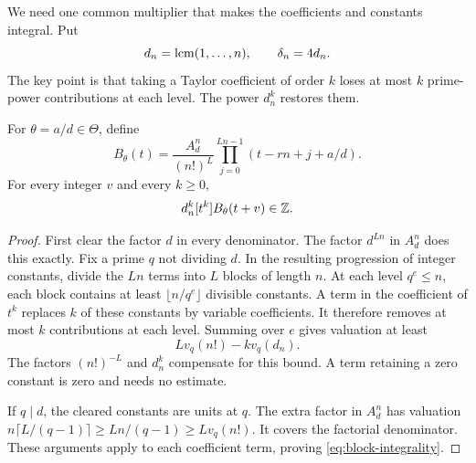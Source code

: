 We need one common multiplier that makes the coefficients and constants
integral. Put
\[
 d_n=\operatorname{lcm}(1,\ldots,n),\qquad \delta_n=4d_n.
\]
The key point is that taking a Taylor coefficient of order $k$ loses
at most $k$ prime-power contributions at each level. The power
$d_n^k$ restores them.

\begin{lemma}\label{lem:progression}
For $\theta=a/d\in\Theta$, define
\[
 B_\theta(t)=\frac{A_d^n}{(n!)^L}
                  \prod_{j=0}^{Ln-1}(t-rn+j+a/d).
\]
For every integer $v$ and every $k\ge0$,
\begin{equation}\label{eq:block-integrality}
 d_n^k[t^k]B_\theta(t+v)\in\mathbb Z.
\end{equation}
\end{lemma}
\begin{proof}
First clear the factor $d$ in every denominator. The factor $d^{Ln}$
in $A_d^n$ does this exactly. Fix a prime $q$ not dividing $d$.
In the resulting progression of integer constants, divide the $Ln$
terms into $L$ blocks of length $n$. At each level $q^e\le n$,
each block contains at least $\lfloor n/q^e\rfloor$ divisible
constants. A term in the coefficient of $t^k$ replaces $k$ of these
constants by variable coefficients. It therefore removes at most
$k$ contributions at each level. Summing over $e$ gives valuation
at least
\[
 L v_q(n!)-k v_q(d_n).
\]
The factors $(n!)^{-L}$ and $d_n^k$ compensate for this bound.
A term retaining a zero constant is zero and needs no estimate.

If $q\mid d$, the cleared constants are units at $q$. The extra
factor in $A_d^n$ has valuation
$n\lceil L/(q-1)\rceil\ge Ln/(q-1)\ge L v_q(n!)$.
It covers the factorial denominator. These arguments apply to
each coefficient term, proving \eqref{eq:block-integrality}.
\end{proof}

